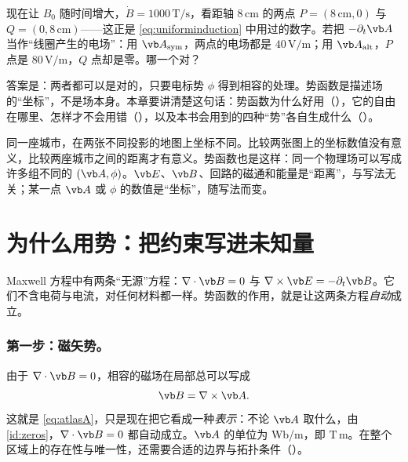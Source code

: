 
现在让 $B_0$ 随时间增大，$\dot B=1000\,\mathrm{T/s}$，看距轴 $8\,\mathrm{cm}$ 的两点 $P=(8\,\mathrm{cm},0)$ 与 $Q=(0,8\,\mathrm{cm})$——这正是 \eqref{eq:uniforminduction} 中用过的数字。若把 $-\partial_t\vb A$ 当作“线圈产生的电场”：用 $\vb A_{\rm sym}$，两点的电场都是 $40\,\mathrm{V/m}$；用 $\vb A_{\rm alt}$，$P$ 点是 $80\,\mathrm{V/m}$，$Q$ 点却是零。哪一个对？

答案是：两者都可以是对的，只要电标势 $\phi$ 得到相容的处理。势函数是描述场的“坐标”，不是场本身。本章要讲清楚这句话：势函数为什么好用（），它的自由在哪里、怎样才不会用错（），以及本书会用到的四种“势”各自生成什么（）。

\begin{intuition}[坐标与距离]
同一座城市，在两张不同投影的地图上坐标不同。比较两张图上的坐标数值没有意义，比较两座城市之间的距离才有意义。势函数也是这样：同一个物理场可以写成许多组不同的 $(\vb A,\phi)$。$\vb E$、$\vb B$、回路的磁通和能量是“距离”，与写法无关；某一点 $\vb A$ 或 $\phi$ 的数值是“坐标”，随写法而变。
\end{intuition}

\section{为什么用势：把约束写进未知量}\label{sec:potentials-why}

Maxwell 方程中有两条“无源”方程：$\nabla\cdot\vb B=0$ 与 $\nabla\times\vb E=-\partial_t\vb B$。它们不含电荷与电流，对任何材料都一样。势函数的作用，就是让这两条方程\emph{自动}成立。

\subsubsection{第一步：磁矢势。} 由于 $\nabla\cdot\vb B=0$，相容的磁场在局部总可以写成
\begin{equation}
\vb B=\nabla\times\vb A .
\label{eq:vectorpotential}
\end{equation}
这就是 \eqref{eq:atlasA}，只是现在把它看成一种\emph{表示}：不论 $\vb A$ 取什么，由 \eqref{id:zeros}，$\nabla\cdot\vb B=0$ 都自动成立。$\vb A$ 的单位为 Wb/m，即 $\mathrm{T\,m}$。在整个区域上的存在性与唯一性，还需要合适的边界与拓扑条件（）。


